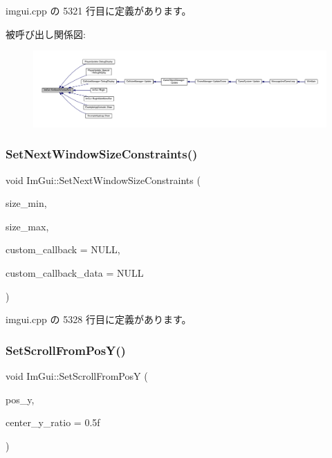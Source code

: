  imgui.\+cpp の 5321 行目に定義があります。

被呼び出し関係図\+:
\nopagebreak
\begin{figure}[H]
\begin{center}
\leavevmode
\includegraphics[width=350pt]{namespace_im_gui_ab33717bb71ef5e393ae18656fc6b229d_icgraph}
\end{center}
\end{figure}
\mbox{\label{namespace_im_gui_a06f40aaf9cf2539c8dba43156a131e45}} 
\subsubsection{\texorpdfstring{Set\+Next\+Window\+Size\+Constraints()}{SetNextWindowSizeConstraints()}}
{\footnotesize\ttfamily void Im\+Gui\+::\+Set\+Next\+Window\+Size\+Constraints (\begin{DoxyParamCaption}\item[{const \mbox{\hyperlink{struct_im_vec2}{Im\+Vec2}} \&}]{size\+\_\+min,  }\item[{const \mbox{\hyperlink{struct_im_vec2}{Im\+Vec2}} \&}]{size\+\_\+max,  }\item[{\mbox{\hyperlink{imgui_8h_abc6351d68ee31882cbb95d2b3d835cae}{Im\+Gui\+Size\+Constraint\+Callback}}}]{custom\+\_\+callback = {\ttfamily NULL},  }\item[{void $\ast$}]{custom\+\_\+callback\+\_\+data = {\ttfamily NULL} }\end{DoxyParamCaption})}



 imgui.\+cpp の 5328 行目に定義があります。

\mbox{\label{namespace_im_gui_a57d8e9497ad39584ba740cef70b78fb4}} 
\subsubsection{\texorpdfstring{Set\+Scroll\+From\+Pos\+Y()}{SetScrollFromPosY()}}
{\footnotesize\ttfamily void Im\+Gui\+::\+Set\+Scroll\+From\+PosY (\begin{DoxyParamCaption}\item[{float}]{pos\+\_\+y,  }\item[{float}]{center\+\_\+y\+\_\+ratio = {\ttfamily 0.5f} }\end{DoxyParamCaption})}



